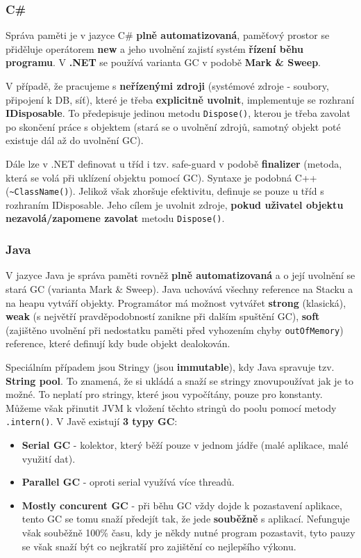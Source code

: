 \subsubsection{C\#}
Správa paměti je v jazyce C\# \textbf{plně automatizovaná}, paměťový prostor se přiděluje operátorem \textbf{new} a jeho uvolnění zajistí systém \textbf{řízení běhu programu}. V \textbf{.NET} se používá varianta GC v podobě \textbf{Mark \& Sweep}.

V případě, že pracujeme s \textbf{neřízenými zdroji} (systémové zdroje - soubory, připojení k DB, síť), které je třeba \textbf{explicitně uvolnit}, implementuje se rozhraní \textbf{IDisposable}. To předepisuje jedinou metodu \texttt{Dispose()}, kterou je třeba zavolat po skončení práce s objektem (stará se o uvolnění zdrojů, samotný objekt poté existuje dál až do uvolnění GC).

Dále lze v .NET definovat u tříd i tzv. safe-guard v podobě \textbf{finalizer} (metoda, která se volá při uklízení objektu pomocí GC). Syntaxe je podobná C++ (\texttt{\textasciitilde{}ClassName()}). Jelikož však zhoršuje efektivitu, definuje se pouze u tříd s rozhraním IDisposable. Jeho cílem je uvolnit zdroje, \textbf{pokud uživatel objektu nezavolá/zapomene zavolat} metodu \texttt{Dispose()}. 

\subsubsection{Java}
V jazyce Java je správa paměti rovněž \textbf{plně automatizovaná} a o její uvolnění se stará GC (varianta Mark \& Sweep). Java uchovává všechny reference na Stacku a na heapu vytváří objekty. Programátor má možnost vytvářet \textbf{strong} (klasická), \textbf{weak} (s největří pravděpodobností zanikne při dalším spuštění GC), \textbf{soft} (zajištěno uvolnění při nedostatku paměti před vyhozením chyby \texttt{outOfMemory}) reference, které definují kdy bude objekt dealokován.

Speciálním případem jsou Stringy (jsou \textbf{immutable}), kdy Java spravuje tzv. \textbf{String pool}. To znamená, že si ukládá a snaží se stringy znovupoužívat jak je to možné. To neplatí pro stringy, které jsou vypočítány, pouze pro konstanty. Můžeme však přinutit JVM k vložení těchto stringů do poolu pomocí metody \texttt{.intern()}. V Javě existují \textbf{3 typy GC}:
\begin{itemize}
\item \textbf{Serial GC} - kolektor, který běží pouze v jednom jádře (malé aplikace, malé využití dat).
\item \textbf{Parallel GC} - oproti serial využívá více threadů.
\item \textbf{Mostly concurent GC} - při běhu GC vždy dojde k pozastavení aplikace, tento GC se tomu snaží předejít tak, že jede \textbf{souběžně} s aplikací. Nefunguje však souběžně 100\% času, kdy je někdy nutné program pozastavit, tyto pauzy se však snaží být co nejkratší pro zajištění co nejlepšího výkonu.
\end{itemize}

